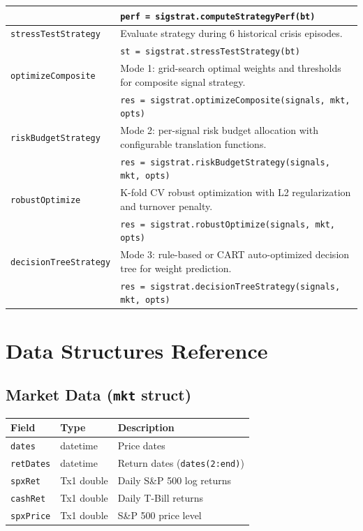 \documentclass[11pt,a4paper]{article}
\begin{document}
\begin{longtable}{p{3.8cm} p{11.2cm}}
& {\small\texttt{perf = sigstrat.computeStrategyPerf(bt)}} \\
\midrule
\texttt{stressTestStrategy} & Evaluate strategy during 6 historical crisis episodes. \\
& {\small\texttt{st = sigstrat.stressTestStrategy(bt)}} \\
\midrule
\texttt{optimizeComposite} & Mode 1: grid-search optimal weights and thresholds for composite signal strategy. \\
& {\small\texttt{res = sigstrat.optimizeComposite(signals, mkt, opts)}} \\
\midrule
\texttt{riskBudgetStrategy} & Mode 2: per-signal risk budget allocation with configurable translation functions. \\
& {\small\texttt{res = sigstrat.riskBudgetStrategy(signals, mkt, opts)}} \\
\midrule
\texttt{robustOptimize} & K-fold CV robust optimization with L2 regularization and turnover penalty. \\
& {\small\texttt{res = sigstrat.robustOptimize(signals, mkt, opts)}} \\
\midrule
\texttt{decisionTreeStrategy} & Mode 3: rule-based or CART auto-optimized decision tree for weight prediction. \\
& {\small\texttt{res = sigstrat.decisionTreeStrategy(signals, mkt, opts)}} \\
\bottomrule
\end{longtable}
\newpage
\section{Data Structures Reference}

\subsection{Market Data (\texttt{mkt} struct)}
\begin{center}
\begin{tabularx}{\textwidth}{l l X}
\toprule
\textbf{Field} & \textbf{Type} & \textbf{Description} \\
\midrule
\texttt{dates} & datetime & Price dates \\
\texttt{retDates} & datetime & Return dates (\texttt{dates(2:end)}) \\
\texttt{spxRet} & Tx1 double & Daily S\&P 500 log returns \\
\texttt{cashRet} & Tx1 double & Daily T-Bill returns \\
\texttt{spxPrice} & Tx1 double & S\&P 500 price level \\
\bottomrule
\end{tabularx}
\end{center}
\end{document}
